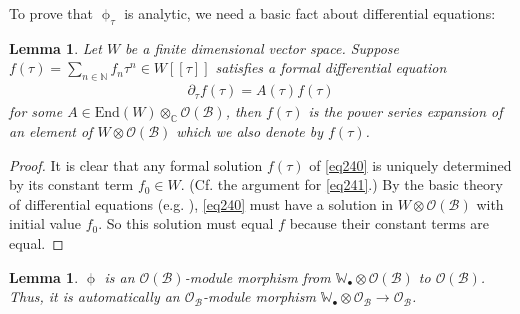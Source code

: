 \documentclass[12pt,a4paper,notitlepage]{article}
\theoremstyle{definition}
\theoremstyle{plain}
\newtheorem{lm}[df]{Lemma}
\newcommand{\mc}{\mathcal}
\newcommand{\End}{\mathrm{End}} %
\newcommand{\scr}{\mathscr}
\newcommand{\blt}{\bullet}
\newcommand{\Wbb}{\mathbb W}
\newcommand{\Cbb}{\mathbb C}
\newcommand{\Nbb}{\mathbb N}
\numberwithin{equation}{section}
\begin{document}
To prove that $\upphi_\tau$ is analytic, we need a basic fact about differential equations:

\begin{lm}\label{lb141}
Let $W$ be a finite dimensional vector space. Suppose $f(\tau)=\sum_{n\in\Nbb}f_n\tau^n\in W[[\tau]]$ satisfies a formal differential equation
\begin{align}
\partial_\tau f(\tau)=A(\tau)f(\tau)\label{eq240}
\end{align}
for some $A\in\End(W)\otimes_\Cbb\scr O(\mc B)$, then $f(\tau)$ is the power series expansion of an element of $W\otimes\scr O(\mc B)$ which we also denote by $f(\tau)$.
\end{lm}

\begin{proof}
It is clear that any formal solution $f(\tau)$ of \eqref{eq240} is uniquely determined by its constant term $f_0\in W$. (Cf. the argument for \eqref{eq241}.) By the basic theory of differential equations (e.g. \cite[Thm. B.1]{Kna}), \eqref{eq240} must have a solution in $W\otimes\scr O(\mc B)$ with initial value $f_0$. So this solution must equal $f$ because their constant terms are equal.
\end{proof}



\begin{lm}\label{lb142}
$\upphi$ is an $\scr O(\mc B)$-module morphism from $\Wbb_\blt\otimes\scr O(\mc B)$ to $\scr O(\mc B)$. Thus, it is automatically an $\scr O_{\mc B}$-module morphism $\Wbb_\blt\otimes\scr O_{\mc B}\rightarrow\scr O_{\mc B}$.
\end{lm}
\end{document}
